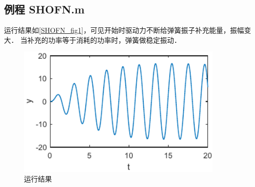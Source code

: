 \subsection{例程 SHOFN.m}

运行结果如\autoref{SHOFN_fig1}，可见开始时驱动力不断给弹簧振子补充能量，振幅变大． 当补充的功率等于消耗的功率时，弹簧做稳定振动．
\begin{figure}[ht]
\centering
\includegraphics[width=10cm]{./figures/SHOFN.pdf}
\caption{运行结果}\label{SHOFN_fig1}
\end{figure}












